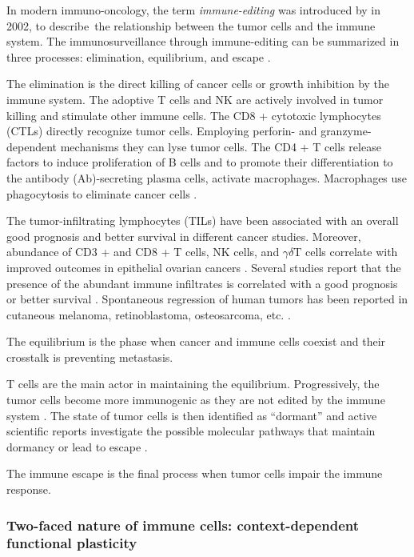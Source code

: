 \documentclass[12pt,]{book}
\theoremstyle{definition}
\theoremstyle{definition}
\theoremstyle{definition}
\theoremstyle{remark}
\begin{document}
In modern immuno-oncology, the term \emph{immune-editing} was introduced
by \citet{Dunn2002} in 2002, to describe~the relationship between the
tumor cells and the immune system. The immunosurveillance through
immune-editing can be summarized in three processes: elimination,
equilibrium, and escape \citep{Dunn2002}.

The elimination is the direct killing of cancer cells or growth
inhibition by the immune system. The adoptive T cells and NK are
actively involved in tumor killing and stimulate other immune cells. The
CD8 + cytotoxic lymphocytes (CTLs) directly recognize tumor cells.
Employing perforin- and granzyme-dependent mechanisms they can lyse
tumor cells. The CD4 + T cells release factors to induce proliferation
of B cells and to promote their differentiation to the antibody
(Ab)-secreting plasma cells, activate macrophages. Macrophages use
phagocytosis to eliminate cancer cells \citep{Vesely2011}.

The tumor-infiltrating lymphocytes (TILs) have been associated with an
overall good prognosis and better survival in different cancer studies.
Moreover, abundance of CD3 + and CD8 + T cells, NK cells, and
\(\gamma\delta\)T cells correlate with improved outcomes in epithelial
ovarian cancers \citep{Marquez-Medina2012}. Several studies report that
the presence of the abundant immune infiltrates is correlated with a
good prognosis or better survival
\citep{Kornstein1983, Baxevanis1994, Naito1998, Pages2005}. Spontaneous
regression of human tumors has been reported in cutaneous melanoma,
retinoblastoma, osteosarcoma, etc. \citep{Aris2012}.

The equilibrium is the phase when cancer and immune cells coexist and
their crosstalk is preventing metastasis.

T cells are the main actor in maintaining the equilibrium.
Progressively, the tumor cells become more immunogenic as they are not
edited by the immune system \citep{Bhatia2011}. The state of tumor cells
is then identified as ``dormant'' and active scientific reports
investigate the possible molecular pathways that maintain dormancy or
lead to escape \citep{Teng2008}.

The immune escape is the final process when tumor cells impair the
immune response.

\hypertarget{two-faced-nature-of-immune-cells-context-dependent-functional-plasticity}{%
\subsubsection{Two-faced nature of immune cells: context-dependent
functional
plasticity}\label{two-faced-nature-of-immune-cells-context-dependent-functional-plasticity}}
\end{document}
